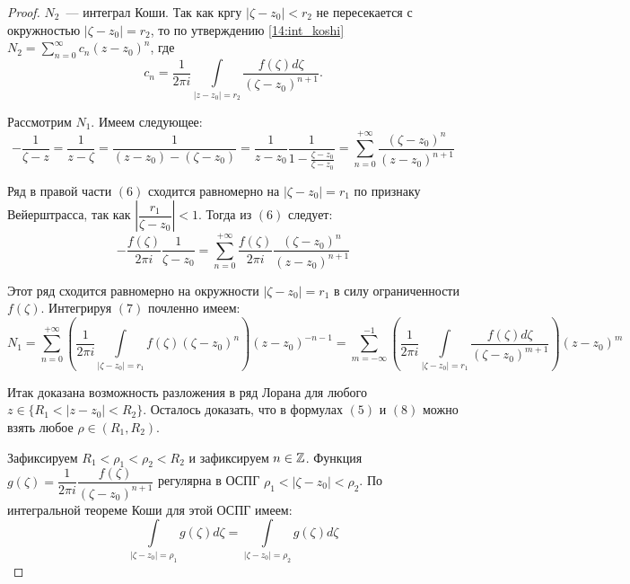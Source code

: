 \begin{proof}
\begin{minipage}[c]{0.67\textwidth}
        \(N_2\)~--- интеграл Коши. Так как кргу \(|\zeta - z_0| < r_2\) не пересекается с 
        окружностью \(|\zeta - z_0| = r_2\), то по утверждению \ref{14:int_koshi} \(N_2 = 
        \sum\limits_{n = 0}^\infty c_n (z-z_0)^n\), где 
        \[
        c_n = \dfrac{1}{2 \pi i} \int\limits_{|z - z_0| = r_2} \dfrac{f(\zeta) d\zeta}{(\zeta - z_0)
         ^ {n+1}}. \tag{5}
        \]
    \end{minipage}

    Рассмотрим \(N_1\). Имеем следующее:
    \[
    - \dfrac{1}{\zeta - z} = \dfrac{1}{z - \zeta} = \dfrac{1}{(z-z_0) - (\zeta - z_0)} = 
    \dfrac{1}{z-z_0} \dfrac{1}{1 - \frac{\zeta - z_0}{\zeta - z_0}} = \sum\limits_{n=0}^{+\infty}
    \dfrac{(\zeta - z_0)^n}{(z - z_0)^{n+1}} \tag{6}
    \]

    Ряд в правой части \((6)\) сходится равномерно на \(|\zeta - z_0| = r_1\) по признаку 
    Вейерштрасса, так как \(\left|\dfrac{r_1}{\zeta - z_0}\right| < 1\). Тогда из \((6)\) следует:
    \[
    - \dfrac{f(\zeta)}{2 \pi i} \dfrac{1}{\zeta - z_0} = \sum\limits_{n=0}^{+\infty} 
    \dfrac{f(\zeta)}{2 \pi i} \dfrac{(\zeta - z_0)^n}{(z - z_0)^{n+1}} \tag{7}
    \]

    Этот ряд сходится равномерно на окружности \(|\zeta - z_0| = r_1\) в силу ограниченности 
    \(f(\zeta)\). Интегрируя \((7)\) почленно имеем:
    \[
    N_1 = \sum\limits_{n=0}^{+\infty} (\dfrac{1}{2 \pi i}\int\limits_{|\zeta - z_0| = r_1} 
    f(\zeta) (\zeta - z_0)^n) (z-z_0)^{-n-1} = \sum\limits_{m = - \infty} ^ {-1} (\dfrac{1}{2 \pi i}
    \int\limits_{|\zeta - z_0| = r_1} \dfrac{f(\zeta) d\zeta}{(\zeta - z_0)^{m+1}}) (z-z_0)^m 
    \tag{8}
    \]

    Итак доказана возможность разложения в ряд Лорана для любого \(z \in \{R_1 < |z-z_0| < R_2\}\).
    Осталось доказать, что в формулах \((5)\) и \((8)\) можно взять любое \(\rho \in (R_1, R_2)\).

    Зафиксируем \(R_1 < \rho_1 < \rho_2 < R_2\) и зафиксируем \(n \in \mathbb{Z}\). Функция \(g(\zeta) = 
    \dfrac{1}{2 \pi i} \dfrac{f(\zeta)}{(\zeta - z_0)^{n+1}}\) регулярна в ОСПГ \(\rho_1 < |\zeta - 
    z_0| < \rho_2\). По интегральной теореме Коши для этой ОСПГ имеем:
    \[
    \int\limits_{|\zeta - z_0| = \rho_1} g(\zeta) d\zeta = \int\limits_{|\zeta - z_0| = \rho_2} 
    g(\zeta) d\zeta
    \]


\end{proof}
